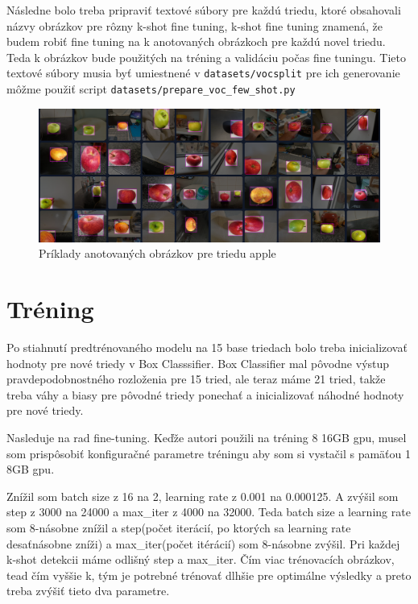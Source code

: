 Následne bolo treba pripraviť textové súbory pre každú triedu, ktoré obsahovali názvy obrázkov pre rôzny k-shot fine tuning, k-shot fine tuning znamená, že budem robiť fine tuning na k anotovaných obrázkoch pre každú novel triedu. Teda k obrázkov bude použitých na tréning a validáciu počas fine tuningu. Tieto textové súbory musia byť umiestnené v \texttt{datasets/vocsplit} pre ich generovanie môžme použiť script \texttt{datasets/prepare\_voc\_few\_shot.py}


\begin{figure}[H]
\includegraphics[width=\textwidth]{images/apple_example_annotations.png}
\centering
\caption{Príklady anotovaných obrázkov pre triedu apple}
\label{fig:image401}
\end{figure}


\section{Tréning}

Po stiahnutí predtrénovaného modelu na 15 base triedach bolo treba inicializovať hodnoty pre nové triedy v Box Classsifier. Box Classifier mal pôvodne výstup pravdepodobnostného rozloženia pre 15 tried, ale teraz máme 21 tried, takže treba váhy a biasy pre pôvodné triedy ponechať a inicializovať náhodné hodnoty pre nové triedy. 

Nasleduje na rad fine-tuning. Keďže autori použili na tréning 8 16GB gpu, musel som prispôsobiť konfiguračné parametre tréningu aby som si vystačil s pamäťou 1 8GB gpu. 

Znížil som batch size z 16 na 2, learning rate z 0.001 na 0.000125. A zvýšil som step z 3000 na 24000 a max\_iter z 4000 na 32000. Teda batch size a learning rate som 8-násobne znížil a step(počet iterácií, po ktorých sa learning rate desaťnásobne zníži) a max\_iter(počet itérácií) som 8-násobne zvýšil. Pri každej k-shot detekcii máme odlišný step a max\_iter. Čím viac trénovacích obrázkov, tead čím vyššie k, tým je potrebné trénovať dlhšie pre optimálne výsledky a preto treba zvýšiť tieto dva parametre. 

